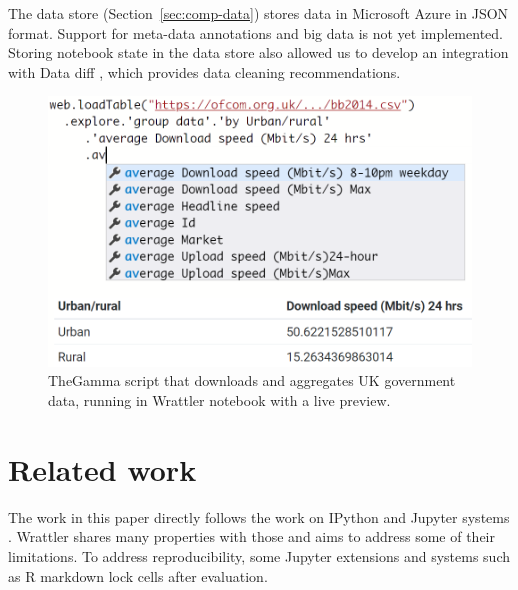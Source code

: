 \documentclass[sigplan]{acmart}\settopmatter{printfolios=true,printccs=false,printacmref=false}
\begin{document}
The data store (Section~\ref{sec:comp-data}) stores data in Microsoft Azure in JSON format. Support 
for meta-data annotations and big data is not yet implemented. Storing notebook state in the data
store also allowed us to develop an integration with Data diff \cite{datadiff},
which provides data cleaning recommendations.

\begin{figure}
\vspace{-0.5em}
\hspace{-1em}
\includegraphics[scale=0.335]{gamma.png}
\caption{\small{TheGamma script that downloads and aggregates UK government data, running in 
  Wrattler notebook with a live preview.}}
\label{fig:gamma}
\vspace{-0.5em}
\end{figure}



\section{Related work}

The work in this paper directly follows the work on IPython and Jupyter systems
\cite{ipython,jupyter}. Wrattler shares many properties with those and aims to address some
of their limitations. To address reproducibility, some Jupyter extensions and systems such
as R markdown %
lock cells after evaluation. 
\end{document}
